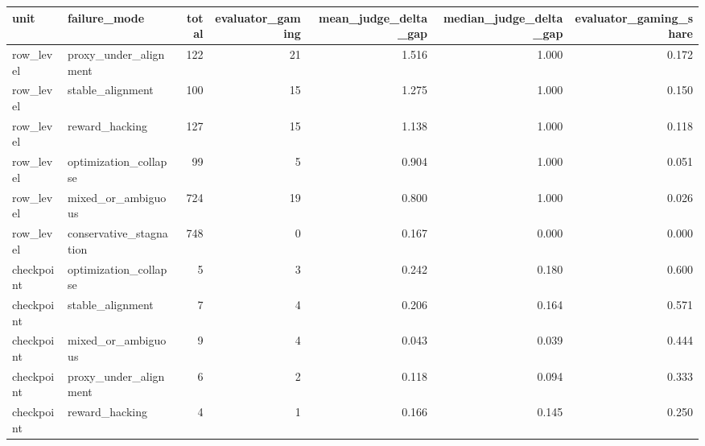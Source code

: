 \begin{tabular}{llrrrrr}
\toprule
unit & failure_mode & total & evaluator_gaming & mean_judge_delta_gap & median_judge_delta_gap & evaluator_gaming_share \\
\midrule
row_level & proxy_under_alignment & 122 & 21 & 1.516 & 1.000 & 0.172 \\
row_level & stable_alignment & 100 & 15 & 1.275 & 1.000 & 0.150 \\
row_level & reward_hacking & 127 & 15 & 1.138 & 1.000 & 0.118 \\
row_level & optimization_collapse & 99 & 5 & 0.904 & 1.000 & 0.051 \\
row_level & mixed_or_ambiguous & 724 & 19 & 0.800 & 1.000 & 0.026 \\
row_level & conservative_stagnation & 748 & 0 & 0.167 & 0.000 & 0.000 \\
checkpoint & optimization_collapse & 5 & 3 & 0.242 & 0.180 & 0.600 \\
checkpoint & stable_alignment & 7 & 4 & 0.206 & 0.164 & 0.571 \\
checkpoint & mixed_or_ambiguous & 9 & 4 & 0.043 & 0.039 & 0.444 \\
checkpoint & proxy_under_alignment & 6 & 2 & 0.118 & 0.094 & 0.333 \\
checkpoint & reward_hacking & 4 & 1 & 0.166 & 0.145 & 0.250 \\
\bottomrule
\end{tabular}
